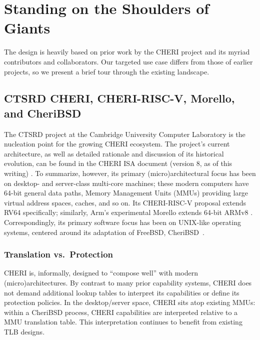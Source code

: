 \chapter{Standing on the Shoulders of Giants}
\label{app:related}

The \cherimcu{} design is heavily based on prior work by the CHERI project and its myriad contributors and collaborators.
Our targeted use case differs from those of earlier projects, so we present a brief tour through the existing landscape.

\section{CTSRD CHERI, CHERI-RISC-V, Morello, and CheriBSD}

The CTSRD project at the Cambridge University Computer Laboratory is the nucleation point for the growing CHERI ecosystem.
The project's current architecture, as well as detailed rationale and discussion of its historical evolution, can be found in the CHERI ISA document (version 8, as of this writing) \cite{UCAM-CL-TR-951}.
To summarize, however, its primary (micro)architectural focus has been on desktop- and server-class multi-core machines; these modern computers have 64-bit general data paths, Memory Management Units (MMUs) providing large virtual address spaces, caches, and so on.
Its CHERI-RISC-V proposal extends RV64 specifically; similarly, Arm's experimental Morello extends 64-bit ARMv8 \cite{arm-morello}.
Correspondingly, its primary software focus has been on UNIX-like operating systems, centered around its adaptation of FreeBSD, CheriBSD~\cite{Davis_CheriABIEnforcingValid_2019}.

\subsection{Translation vs.\ Protection}

CHERI is, informally, designed to ``compose well'' with modern (micro)architectures.
By contrast to many prior capability systems, CHERI does not demand additional lookup tables to interpret its capabilities or define its protection policies.
In the desktop/server space, CHERI sits atop existing MMUs: within a CheriBSD process, CHERI capabilities are interpreted relative to a MMU translation table.
This interpretation continues to benefit from existing TLB designs.

